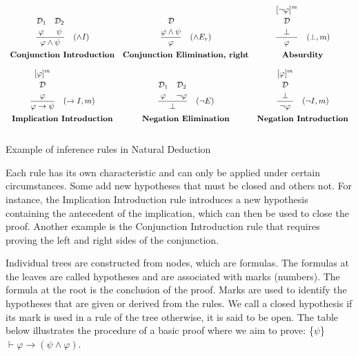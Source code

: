 \begin{table}[h]
\[
\begin{array}{c c c}
\frac{\overset{\displaystyle \mathcal{D}_1\strut}{\displaystyle \varphi\strut} \quad \overset{\displaystyle \mathcal{D}_2\strut}{\displaystyle \psi\strut}}{\displaystyle \varphi \land \psi\strut} \quad (\land I) & 
\frac{\displaystyle \overset{\displaystyle \mathcal{D}\strut}{\varphi \land \psi\strut}\strut}{\displaystyle \varphi\strut} \quad (\land E_r) & 
\frac{\overset{\displaystyle[\neg\varphi]^m\strut}{\overset{\displaystyle\mathcal{D} \strut} {\displaystyle\bot 
\strut}}}{\displaystyle \varphi\strut} \quad (\bot, m) \\[10pt]
\textbf{Conjunction Introduction} & \textbf{Conjunction Elimination, right} & \textbf{Absurdity} \\[10pt]

\frac{\overset{\displaystyle [\varphi]^m\strut}{\overset{\displaystyle \mathcal{D}\strut}{\displaystyle\varphi\strut}\strut}\strut}{\displaystyle \varphi \to \psi\strut} \quad (\to I, m) & 
\frac{\overset{\displaystyle \mathcal{D}_1\strut}{\displaystyle \varphi\strut} \quad \overset{\displaystyle \mathcal{D}_2\strut}{\displaystyle \neg \varphi\strut}}{\displaystyle \bot\strut} \quad (\neg E) & 
\frac{\overset{\displaystyle [\varphi]^m\strut}{\overset{\displaystyle \mathcal{D}\strut}{\displaystyle\bot \strut}\strut}\strut}{\displaystyle \neg \varphi\strut} \quad (\neg I, m) \\[10pt]
\textbf{Implication Introduction} & \textbf{Negation Elimination} & \textbf{Negation Introduction} \\[10pt]
\end{array}
\]

\caption{Example of inference rules in Natural Deduction}
\label{tab:inf_rules}
\end{table}
Each rule has its own characteristic and can only be applied under certain circumstances. Some add new hypotheses that must be closed and others not. For instance, the Implication Introduction rule introduces a new hypothesis containing the antecedent of the implication, which can then be used to close the proof. Another example is the Conjunction Introduction rule that requires proving the left and right sides of the conjunction.

Individual trees are constructed from nodes, which are formulas. The formulas at the leaves are called hypotheses and are associated with marks (numbers). The formula at the root is the conclusion of the proof. Marks are used to identify the hypotheses that are given or derived from the rules. We call a closed hypothesis if its mark is used in a rule of the tree otherwise, it is said to be open. The table below illustrates the procedure of a basic proof where we aim to prove: \{\(\psi\)\} \( \vdash \varphi \to (\psi \land \varphi) \).

